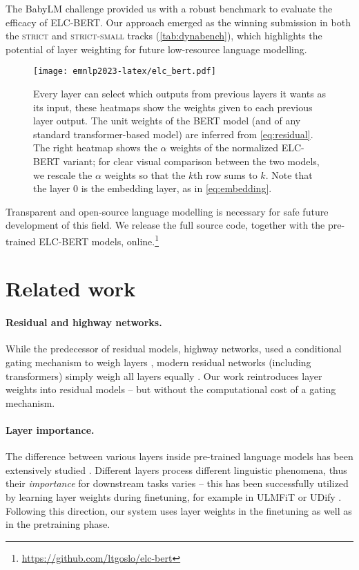 The BabyLM challenge provided us with a robust benchmark to evaluate the efficacy of ELC-BERT. Our approach emerged as the winning submission in both the \textsc{strict} and \textsc{strict-small} tracks (\cref{tab:dynabench}), which highlights the potential of layer weighting for future low-resource language modelling.

\begin{figure*}[!t]
    \texttt{[image: emnlp2023-latex/elc\_bert.pdf]}
    \caption{Every layer can select which outputs from previous layers it wants as its input, these heatmaps show the weights given to each previous layer output. The unit weights of the BERT model (and of any standard transformer-based model) are inferred from \cref{eq:residual}. The right heatmap shows the $\alpha$ weights of the normalized ELC-BERT variant; for clear visual comparison between the two models, we rescale the $\alpha$ weights so that the $k$th row sums to $k$. Note that the layer 0 is the embedding layer, as in \cref{eq:embedding}.}
    \label{fig:layer-weights}
\end{figure*}

Transparent and open-source language modelling is necessary for safe future development of this field. We release the full source code, together with the pre-trained ELC-BERT models, online.\footnote{\url{https://github.com/ltgoslo/elc-bert}}

\section{Related work}

\paragraph{Residual and highway networks.} While the predecessor of residual models, highway networks, used a conditional gating mechanism to weigh layers \citep{NIPS2015_215a71a1}, modern residual networks (including transformers) simply weigh all layers equally \citep{he2016residual, vaswani2017attention}. Our work reintroduces layer weights into residual models -- but without the computational cost of a gating mechanism.

\paragraph{Layer importance.} The difference between various layers inside pre-trained language models has been extensively studied \citep{jawahar-etal-2019-bert, tenney-etal-2019-bert, niu-etal-2022-bert}. Different layers process different linguistic phenomena, thus their \textit{importance} for downstream tasks varies -- this has been successfully utilized by learning layer weights during finetuning, for example in ULMFiT \citep{howard-ruder-2018-universal} or UDify \citep{kondratyuk-straka-2019-75}. Following this direction, our system uses layer weights in the finetuning as well as in the pretraining phase.

